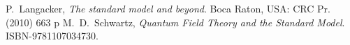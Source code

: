 \begin{thebibliography}{99}
  P.~Langacker,
  \emph{The standard model and beyond}.
  Boca Raton, USA: CRC Pr. (2010) 663 p
  M.~D.~Schwartz,
  \emph{Quantum Field Theory and the Standard Model}.
  ISBN-9781107034730.
\end{thebibliography}



